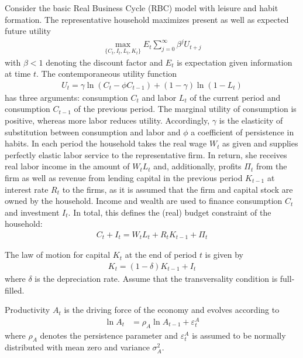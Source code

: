Consider the basic Real Business Cycle (RBC) model with leisure and habit formation. The representative household maximizes present as well as expected future utility
\begin{align*}
    \underset{\{C_{t},I_{t},L_t,K_{t}\}}{\max} E_t \sum_{j=0}^{\infty} \beta^{j} U_{t+j}
\end{align*}
with $\beta <1$ denoting the discount factor and $E_t$ is expectation given information at time $t$. The contemporaneous utility function
\begin{align*}
    U_t = \gamma \ln(C_t - \phi C_{t-1}) + (1-\gamma) \ln{(1-L_t)}
\end{align*}
has three arguments: consumption $C_t$ and labor $L_t$ of the current period and consumption $C_{t-1}$ of the previous period. The marginal utility of consumption is positive, whereas more labor reduces utility. Accordingly, $\gamma$ is the elasticity of substitution between consumption and labor and $\phi$ a coefficient of persistence in habits. In each period the household takes the real wage $W_t$ as given and supplies perfectly elastic labor service to the representative firm. In return, she receives real labor income in the amount of $W_t L_t$ and, additionally, profits $\Pi_t$ from the firm as well as revenue from lending capital in the previous period $K_{t-1}$ at interest rate $R_t$ to the firms, as it is assumed that the firm and capital stock are owned by the household. Income and wealth are used to finance consumption $C_t$ and investment $I_t$. In total, this defines the (real) budget constraint of the household:
\begin{align*}
    C_t + I_t = W_t L_t + R_t K_{t-1} + \Pi_t
\end{align*}

The law of motion for capital $K_t$ at the end of period $t$ is given by
\begin{align*}
    K_{t} = (1-\delta)K_{t-1} + I_t
\end{align*}
where $\delta$ is the depreciation rate. Assume that the transversality condition is full-filled.

Productivity $A_t$ is the driving force of the economy and evolves according to
\begin{align*}
    \ln{A_{t}} & =\rho_A \ln{A_{t-1}}  + \varepsilon_t^A
\end{align*}
where $\rho_A$ denotes the persistence parameter and $\varepsilon_t^A$ is assumed to be normally distributed with mean zero and variance $\sigma_A^2$.

